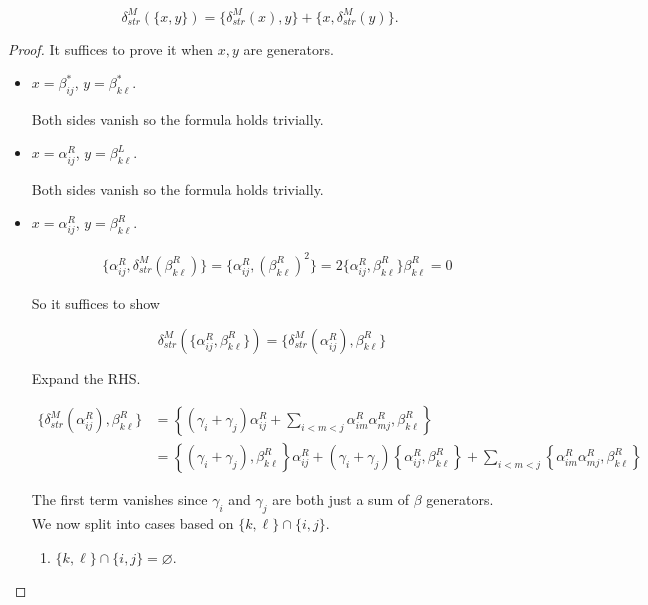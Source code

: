 \documentclass[10pt,a4paper]{amsart}
\begin{document}
	\begin{Lemma} \label{lem:deltaMderivation}
		
		\[ \delta_{str}^M\left(\{x,y\}\right) = \{\delta_{str}^M( x), y\} + \{x, \delta_{str}^M(y)\}.\]
		
	\end{Lemma}

	\begin{proof}
		It suffices to prove it when $x,y$ are generators.
		\begin{itemize}
			\item $x=\beta_{ij}^*$, $y=\beta_{k\ell}^*$.
			
			Both sides vanish so the formula holds trivially.
			
			\item $x=\alpha_{ij}^R$, $y=\beta_{k\ell}^L$. 
			
			Both sides vanish so the formula holds trivially. 
			
						
			\item $x=\alpha_{ij}^R$, $y=\beta_{k\ell}^R$. 
			
			\begin{align*}
				&\{\alpha_{ij}^R, \delta_{str}^M(\beta_{k\ell}^R)\} = \{\alpha_{ij}^R, (\beta_{k\ell}^R)^2\} = 2\{\alpha_{ij}^R, \beta_{k\ell}^R\}\beta_{k\ell}^R = 0
			\end{align*}
			
			So it suffices to show
			
			\[ \delta_{str}^M\left(\{\alpha_{ij}^R,\beta_{k\ell}^R\}\right) = \{\delta_{str}^M(\alpha_{ij}^R), \beta_{k\ell}^R\}\]
			
			Expand the RHS.
			
			\begin{align*}
				\{\delta_{str}^M(\alpha_{ij}^R), \beta_{k\ell}^R\} &= \left\{ (\gamma_i+\gamma_j) \alpha_{ij}^R + \sum_{i<m<j} \alpha_{im}^R\alpha_{mj}^R , \beta_{k\ell}^R \right\} \\
				&= \left\{(\gamma_i+\gamma_j), \beta_{k\ell}^R \right\} \alpha_{ij}^R + (\gamma_i+\gamma_j)\left\{ \alpha_{ij}^R, \beta_{k\ell}^R \right\} + \sum_{i<m<j} \left\{\alpha_{im}^R\alpha_{mj}^R, \beta_{k\ell}^R \right\}
			\end{align*}
			
			The first term vanishes since $\gamma_i$ and $\gamma_j$ are both just a sum of $\beta$ generators. We now split into cases based on $\{k,\ell\} \cap \{i,j\}$.
			
			\begin{enumerate}[label=Case \arabic*.]
				\item $\{k,\ell\} \cap \{i,j\} = \varnothing$.
				

\end{enumerate}
\end{itemize}
\end{proof}
\end{document}
